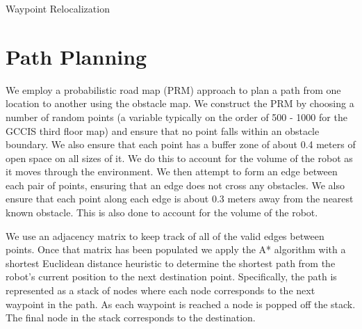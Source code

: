 \documentclass[11pt]{article}
\begin{document}
\begin{algorithm}[H]
\caption{Waypoint Relocalization}
\label{alg:waypointloc}
\begin{algorithmic}[1]

	\ENDIF
\ENDIF

\end{algorithmic}
\end{algorithm}


\section{Path Planning}

We employ a probabilistic road map (PRM) approach to plan a path from one location to another using the obstacle map. We construct the PRM by choosing a number of random points (a variable typically on the order of 500 - 1000 for the GCCIS third floor map) and ensure that no point falls within an obstacle boundary. We also ensure that each point has a buffer zone of about 0.4 meters of open space on all sizes of it. We do this to account for the volume of the robot as it moves through the environment. We then attempt to form an edge between each pair of points, ensuring that an edge does not cross any obstacles. We also ensure that each point along each edge is about 0.3 meters away from the nearest known obstacle. This is also done to account for the volume of the robot. 

We use an adjacency matrix to keep track of all of the valid edges between points. Once that matrix has been populated we apply the A* algorithm with a shortest Euclidean distance heuristic to determine the shortest path from the robot's current position to the next destination point. Specifically, the path is represented as a stack of nodes where each node corresponds to the next waypoint in the path. As each waypoint is reached a node is popped off the stack. The final node in the stack corresponds to the destination.
\end{document}
